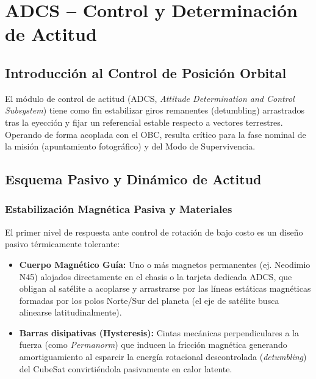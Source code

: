 \chapter{ADCS – Control y Determinación de Actitud}

\section{Introducción al Control de Posición Orbital}
El módulo de control de actitud (ADCS, \textit{Attitude Determination and Control Subsystem}) tiene como fin estabilizar giros remanentes (detumbling) arrastrados tras la eyección y fijar un referencial estable respecto a vectores terrestres. Operando de forma acoplada con el OBC, resulta crítico para la fase nominal de la misión (apuntamiento fotográfico) y del Modo de Supervivencia.

\section{Esquema Pasivo y Dinámico de Actitud}

\subsection{Estabilización Magnética Pasiva y Materiales}
El primer nivel de respuesta ante control de rotación de bajo costo es un diseño pasivo térmicamente tolerante:
\begin{itemize}
    \item \textbf{Cuerpo Magnético Guía:} Uno o más magnetos permanentes (ej. Neodimio N45) alojados directamente en el chasis o la tarjeta dedicada ADCS, que obligan al satélite a acoplarse y arrastrarse por las líneas estáticas magnéticas formadas por los polos Norte/Sur del planeta (el eje de satélite busca alinearse latitudinalmente).
    \item \textbf{Barras disipativas (Hysteresis):} Cintas mecánicas perpendiculares a la fuerza (como \textit{Permanorm}) que inducen la fricción magnética generando amortiguamiento al esparcir la energía rotacional descontrolada (\textit{detumbling}) del CubeSat convirtiéndola pasivamente en calor latente.
\end{itemize}

